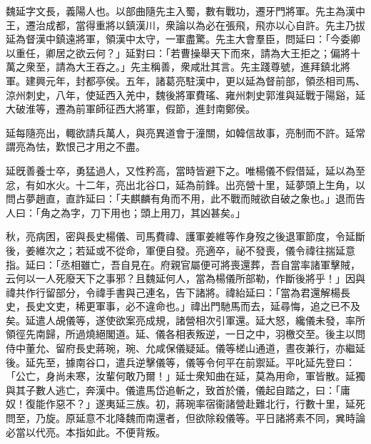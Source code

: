 \begin{pinyinscope}
 
 
 魏延字文長，義陽人也。以部曲隨先主入蜀，數有戰功，遷牙門將軍。先主為漢中王，遷治成都，當得重將以鎮漢川，衆論以為必在張飛，飛亦以心自許。先主乃拔延為督漢中鎮遠將軍，領漢中太守，一軍盡驚。先主大會羣臣，問延曰：「今委卿以重任，卿居之欲云何？」延對曰：「若曹操舉天下而來，請為大王拒之；偏將十萬之衆至，請為大王吞之。」先主稱善，衆咸壯其言。先主踐尊號，進拜鎮北將軍。建興元年，封都亭侯。五年，諸葛亮駐漢中，更以延為督前部，領丞相司馬、涼州刺史，八年，使延西入羌中，魏後將軍費瑤、雍州刺史郭淮與延戰于陽谿，延大破淮等，遷為前軍師征西大將軍，假節，進封南鄭侯。
 
 
 
 
 延每隨亮出，輙欲請兵萬人，與亮異道會于潼關，如韓信故事，亮制而不許。延常謂亮為怯，歎恨己才用之不盡。
 
 
 延旣善養士卒，勇猛過人，又性矜高，當時皆避下之。唯楊儀不假借延，延以為至忿，有如水火。十二年，亮出北谷口，延為前鋒。出亮營十里，延夢頭上生角，以問占夢趙直，直詐延曰：「夫麒麟有角而不用，此不戰而賊欲自破之象也。」退而告人曰：「角之為字，刀下用也；頭上用刀，其凶甚矣。」
 
 
秋，亮病困，密與長史楊儀、司馬費禕、護軍姜維等作身歿之後退軍節度，令延斷後，姜維次之；若延或不從命，軍便自發。亮適卒，祕不發喪，儀令禕往揣延意指。延曰：「丞相雖亡，吾自見在。府親官屬便可將喪還葬，吾自當率諸軍擊賊，云何以一人死廢天下之事邪？且魏延何人，當為楊儀所部勒，作斷後將乎！」因與禕共作行留部分，令禕手書與己連名，告下諸將。禕紿延曰：「當為君還解楊長史，長史文吏，稀更軍事，必不違命也。」禕出門馳馬而去，延尋悔，追之已不及矣。延遣人覘儀等，遂使欲案亮成規，諸營相次引軍還。延大怒，纔儀未發，率所領徑先南歸，所過燒絕閣道。延、儀各相表叛逆，一日之中，羽檄交至。後主以問侍中董允、留府長史蔣琬，琬、允咸保儀疑延。儀等槎山通道，晝夜兼行，亦繼延後。延先至，據南谷口，遣兵逆擊儀等，儀等令何平在前禦延。平叱延先登曰：「公亡，身尚未寒，汝輩何敢乃爾！」延士衆知曲在延，莫為用命，軍皆散。延獨與其子數人逃亡，奔漢中。儀遣馬岱追斬之，致首於儀，儀起自踏之，曰：「庸奴！復能作惡不？」遂夷延三族。初，蔣琬率宿衞諸營赴難北行，行數十里，延死問至，乃旋。原延意不北降魏而南還者，但欲除殺儀等。平日諸將素不同，兾時論必當以代亮。本指如此。不便背叛。
 
 
\end{pinyinscope}